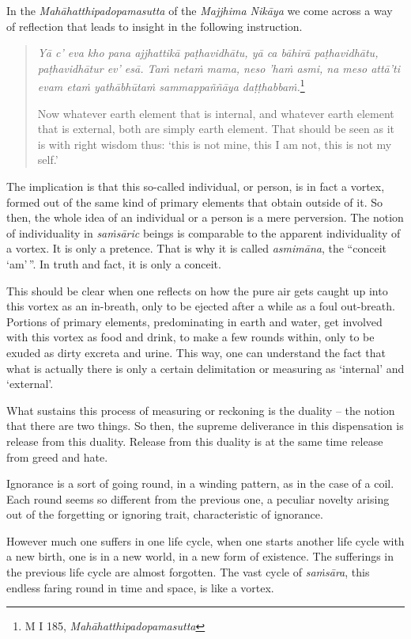 In the \emph{Mahāhatthipadopamasutta} of the \emph{Majjhima Nikāya} we come across a way of reflection that leads to insight in the following instruction.

\begin{quote}
\emph{Yā c' eva kho pana ajjhattikā paṭhavidhātu, yā ca bāhirā paṭhavidhātu, paṭhavidhātur ev' esā. Taṁ netaṁ mama, neso 'haṁ asmi, na meso attā'ti evam etaṁ yathābhūtaṁ sammappaññāya daṭṭhabbaṁ.}\footnote{M I 185, \emph{Mahāhatthipadopamasutta}}

Now whatever earth element that is internal, and whatever earth element that is external, both are simply earth element. That should be seen as it is with right wisdom thus: `this is not mine, this I am not, this is not my self.'
\end{quote}

The implication is that this so-called individual, or person, is in fact a vortex, formed out of the same kind of primary elements that obtain outside of it. So then, the whole idea of an individual or a person is a mere perversion. The notion of individuality in \emph{saṁsāric} beings is comparable to the apparent individuality of a vortex. It is only a pretence. That is why it is called \emph{asmimāna}, the ``conceit `am'\,''. In truth and fact, it is only a conceit.

This should be clear when one reflects on how the pure air gets caught up into this vortex as an in-breath, only to be ejected after a while as a foul out-breath. Portions of primary elements, predominating in earth and water, get involved with this vortex as food and drink, to make a few rounds within, only to be exuded as dirty excreta and urine. This way, one can understand the fact that what is actually there is only a certain delimitation or measuring as `internal' and `external'.

What sustains this process of measuring or reckoning is the duality -- the notion that there are two things. So then, the supreme deliverance in this dispensation is release from this duality. Release from this duality is at the same time release from greed and hate.

Ignorance is a sort of going round, in a winding pattern, as in the case of a coil. Each round seems so different from the previous one, a peculiar novelty arising out of the forgetting or ignoring trait, characteristic of ignorance.

However much one suffers in one life cycle, when one starts another life cycle with a new birth, one is in a new world, in a new form of existence. The sufferings in the previous life cycle are almost forgotten. The vast cycle of \emph{saṁsāra}, this endless faring round in time and space, is like a vortex.

